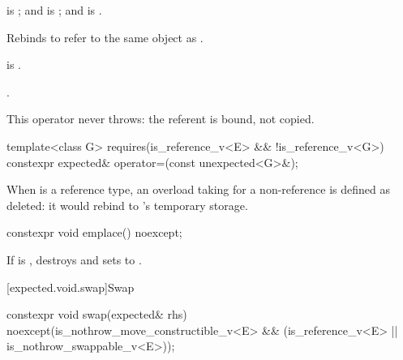 \begin{itemdescr}
\pnum
\constraints
{} is ; and  is ; and  is .

\pnum
\effects
Rebinds  to refer to the same object as .

\pnum
\ensures
{} is .

\pnum
\returns
{}.

\pnum
\remarks
This operator never throws: the referent is bound, not copied.
\end{itemdescr}

%
\begin{itemdecl}
template<class G>
  requires(is_reference_v<E> && !is_reference_v<G>)
constexpr expected& operator=(const unexpected<G>&);
\end{itemdecl}

\begin{itemdescr}
\pnum
\remarks
When  is a reference type, an overload taking  for a non-reference  is defined as deleted: it would rebind  to 's temporary storage.
\end{itemdescr}

%
\begin{itemdecl}
constexpr void emplace() noexcept;
\end{itemdecl}

\begin{itemdescr}
\pnum
\effects
If  is , destroys  and sets  to .
\end{itemdescr}

[expected.void.swap]{Swap}

%
\begin{itemdecl}
constexpr void swap(expected& rhs) noexcept(is_nothrow_move_constructible_v<E> &&
                                            (is_reference_v<E> ||
                                             is_nothrow_swappable_v<E>));
\end{itemdecl}

